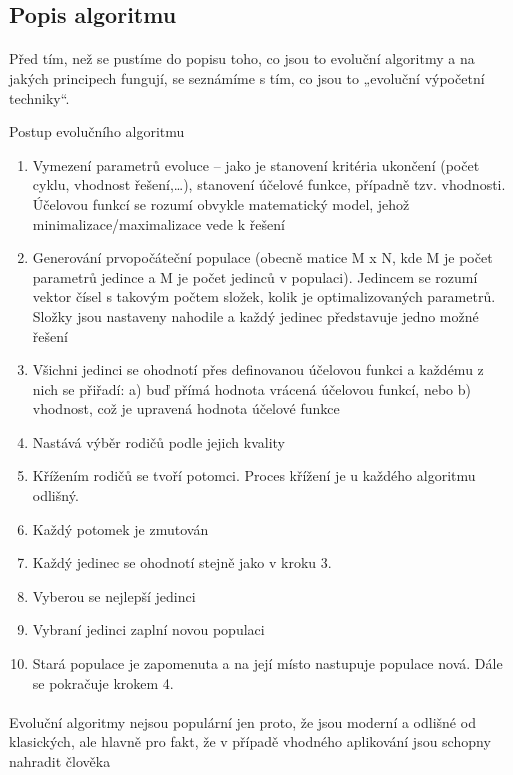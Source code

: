 \documentclass[bc,male,java,dept460]{diploma}		%
\begin{document}

\subsection{Popis algoritmu}
\paragraph*{}
Před tím, než se pustíme do popisu toho, co jsou to evoluční algoritmy a na jakých principech fungují, se seznámíme s tím, co jsou to „evoluční výpočetní techniky“.

\begin{example}
\label{priklad}
Postup evolučního algoritmu
\begin{enumerate}
\item Vymezení parametrů evoluce – jako je stanovení kritéria ukončení (počet cyklu, vhodnost řešení,…), stanovení účelové funkce, případně tzv. vhodnosti. Účelovou funkcí se rozumí obvykle matematický model, jehož minimalizace/maximalizace vede k řešení
\item Generování prvopočáteční populace (obecně matice M x N, kde M je počet parametrů jedince a M je počet jedinců v populaci). Jedincem se rozumí vektor čísel s takovým počtem složek, kolik je optimalizovaných parametrů. Složky jsou nastaveny nahodile a každý jedinec představuje jedno možné řešení
\item Všichni jedinci se ohodnotí přes definovanou účelovou funkci a každému z nich se přiřadí: a) buď přímá hodnota vrácená účelovou funkcí, nebo b) vhodnost, což je upravená hodnota účelové funkce
\item Nastává výběr rodičů podle jejich kvality
\item Křížením rodičů se tvoří potomci. Proces křížení je u každého algoritmu odlišný.
\item Každý potomek je zmutován
\item Každý jedinec se ohodnotí stejně jako v kroku 3.
\item Vyberou se nejlepší jedinci
\item Vybraní jedinci zaplní novou populaci
\item Stará populace je zapomenuta a na její místo nastupuje populace nová. Dále se pokračuje krokem 4.
\end{enumerate}

\paragraph*{}
Evoluční algoritmy nejsou populární jen proto, že jsou moderní a odlišné od klasických, ale hlavně pro fakt, že v případě vhodného aplikování jsou schopny nahradit člověka
\end{example}
\end{document}
